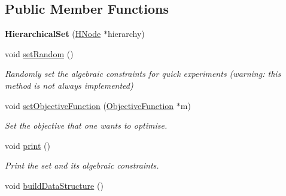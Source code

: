 \subsection*{Public Member Functions}
\begin{DoxyCompactItemize}
\item 
\hypertarget{classHierarchicalSet_a7fd1f8312d26ece557fface14b23cb36}{{\bfseries Hierarchical\-Set} (\hyperlink{classHNode}{H\-Node} $\ast$hierarchy)}\label{classHierarchicalSet_a7fd1f8312d26ece557fface14b23cb36}

\item 
\hypertarget{classHierarchicalSet_abccd5ddb7195f7c8941077783b7335ab}{void \hyperlink{classHierarchicalSet_abccd5ddb7195f7c8941077783b7335ab}{set\-Random} ()}\label{classHierarchicalSet_abccd5ddb7195f7c8941077783b7335ab}

\begin{DoxyCompactList}\small\item\em Randomly set the algebraic constraints for quick experiments (warning\-: this method is not always implemented) \end{DoxyCompactList}\item 
void \hyperlink{classHierarchicalSet_aa555c69a5761820567bfe391969859d3}{set\-Objective\-Function} (\hyperlink{classObjectiveFunction}{Objective\-Function} $\ast$m)
\begin{DoxyCompactList}\small\item\em Set the objective that one wants to optimise. \end{DoxyCompactList}\item 
\hypertarget{classHierarchicalSet_a6692536203bfd050a44e9abef2193564}{void \hyperlink{classHierarchicalSet_a6692536203bfd050a44e9abef2193564}{print} ()}\label{classHierarchicalSet_a6692536203bfd050a44e9abef2193564}

\begin{DoxyCompactList}\small\item\em Print the set and its algebraic constraints. \end{DoxyCompactList}\item 
\hypertarget{classHierarchicalSet_a94642b968f3cc3a8cfed07c2d4eb14ee}{void \hyperlink{classHierarchicalSet_a94642b968f3cc3a8cfed07c2d4eb14ee}{build\-Data\-Structure} ()}\label{classHierarchicalSet_a94642b968f3cc3a8cfed07c2d4eb14ee}


\end{DoxyCompactItemize}
